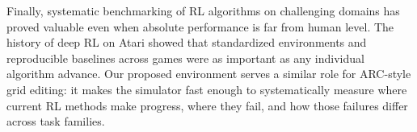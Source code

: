 Finally, systematic benchmarking of RL algorithms on challenging domains has proved valuable even when absolute performance is far from human level. The history of deep RL on Atari \citep{mnihPlayingAtariDeep2013} showed that standardized environments and reproducible baselines across games were as important as any individual algorithm advance. Our proposed environment serves a similar role for ARC-style grid editing: it makes the simulator fast enough to systematically measure where current RL methods make progress, where they fail, and how those failures differ across task families.
